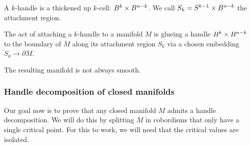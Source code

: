 \begin{definition}
    A $k$-handle is a thickened up $k$-cell: $B^{k} \times B^{n-k}$.
    We call $S_k = S^{k-1} \times B^{n-k}$ the attachment region.

    The act of attaching a $k$-handle to a manifold $M$ is glueing a handle $B^{k} \times B^{n-k}$ to the boundary of $M$ along its attachment region $S_k$ via a chosen embedding $S_k \to  \partial M$.
\end{definition}
\begin{remark}
    The resulting manifold is not always smooth.
\end{remark}

\begin{figure}[H]
    \centering
\end{figure}



\subsubsection*{Handle decomposition of closed manifolds}

Our goal now is to prove that any closed manifold $M$ admits a handle decomposition.
We will do this by splitting $M$ in cobordisms that only have a single critical point.
For this to work, we will need that the critical values are isolated.

